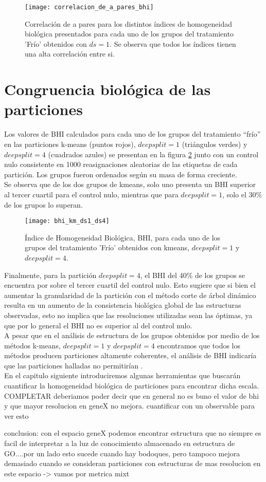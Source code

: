 \begin{figure}[h]
    \centering
    \texttt{[image: correlacion\_de\_a\_pares\_bhi]}
    \caption{Correlación de a pares para los distintos índices de homogeneidad biológica presentados para cada uno de los grupos del tratamiento 'Frío' obtenidos con $ds=1$. Se observa que todos los índices tienen una alta correlación entre si.}
    \label{fig:correlacion_de_a_pares_bhi}
\end{figure}

\section{Congruencia biológica de las particiones}
Los valores de BHI calculados para cada uno de los grupos del tratamiento ``frío'' en las particiones k-means (puntos rojos), $deepsplit=1$ (triángulos verdes) y $deepsplit=4$ (cuadrados azules) se presentan en la figura \ref{fig:bhi_km_ds1_ds4} junto con un control nulo consistente en 1000 reasignaciones aleatorias de las etiquetas de cada partición. Los grupos fueron ordenados según su masa de forma creciente.\\
Se observa que de los dos grupos de kmeans, solo uno presenta un BHI superior al tercer cuartil para el control nulo, mientras que para $deepsplit=1$, solo el 30\% de los grupos lo superan.
\begin{figure}[h]
    \centering
    \texttt{[image: bhi\_km\_ds1\_ds4]}
    \caption{Índice de Homogeneidad Biológica, BHI, para cada uno de los grupos del tratamiento 'Frío' obtenidos con kmeans, $deepsplit=1$ y $deepsplit=4$.}
    \label{fig:bhi_km_ds1_ds4}
\end{figure}
Finalmente, para la partición $deepsplit=4$, el BHI del 40\% de los grupos se encuentra por sobre el tercer cuartil del control nulo. Esto sugiere que si bien el aumentar la granularidad de la partición con el método corte de árbol dinámico resulta en un aumento de la consistencia biológica global de las estructuras observadas, esto no implica que las resoluciones utilizadas sean las óptimas, ya que por lo general el BHI no es superior al del control nulo.\\
A pesar que en el análisis de estructura de los grupos obtenidos por medio de los métodos k-means, $deepsplit=1$ y $deepsplit=4$ encontramos que todos los métodos producen particiones altamente coherentes, el análisis de BHI indicaría que las particiones halladas no permitirían .\\
En el capitulo siguiente introduciremos algunas herramientas que buscarán cuantificar la homogeneidad biológica de particiones para encontrar dicha escala.
COMPLETAR 
deberiamos poder decir que en general no es buno el valor de bhi
y que mayor resolucion en geneX no mejora.
cuantificar con un observable para ver esto

conclusion: con el espacio geneX podemos encontrar estructura que no siempre es facil de interpretar a la luz de conocimiento almacenado en estructura de GO....por un lado esto sucede cuando hay bodoques, pero tampoco mejora demasiado cuando se consideran particiones con estructuras de mas resolucion en este espacio -> vamos por metrica mixt